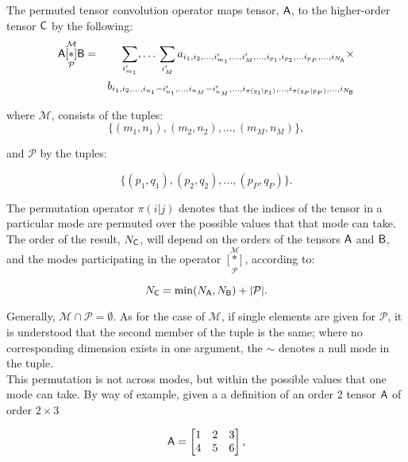 The permuted tensor convolution operator maps tensor, $\mathsf{A}$, to the higher-order tensor $\mathsf{C}$ by the following:
\begin{eqnarray}
\mathsf{A} \underset{\mathcal{P}}{\overset{\mathcal{M}}{[ \ast ]}} {\mathsf{B}} &=& \sum_{i'_{m_1}},\ldots\,\sum_{i_{M}'}   a_{i_1,i_2,...,i_{m_1}',...,i_{M}',...,i_{p_1},i_{p_2},...i_{p_P},...,i_{N_{\mathsf{A}}}} \times \nonumber \\
& &b_{i_1,i_2,...,i_{n_1}-i_{n_1}',...,i_{n_M}-i_{n_M}',...,i_{\pi(q_1|p_1)},...,i_{\pi(q_P|p_P)},...,i_{N_{\mathsf{B}}}}
\label{eq:t2appndx}
\end{eqnarray}

where $\mathcal{M}$, consists of the tuples:
\begin{equation}
\lbrace(m_1,n_1),(m_2,n_2),...,(m_{M},n_{M})\rbrace,
\end{equation}

and $\mathcal{P}$ by the tuples:

\begin{equation}
\lbrace(p_1,q_1),(p_2,q_2),...,(p_{P},q_{P})\rbrace.
\end{equation}

The permutation operator $\pi(i|j)$ denotes that the indices of the tensor in a particular mode are permuted over the possible values that that mode can take.  The order of the result, $N_{\mathsf{C}}$, will depend on the orders of the tensors $\mathsf{A}$ and $\mathsf{B}$, and the modes participating in the operator $\underset{\mathcal{P}}{\overset{\mathcal{M}}{[ \ast ]}}$, according to:

\begin{equation}
N_{\mathsf{C}} = \min(N_{\mathsf{A}},N_{\mathsf{B}}) +  |\mathcal{P}|.
\end{equation}

Generally, $\mathcal{M}\cap\mathcal{P}=\emptyset$.  As for the case of $\mathcal{M}$, if single elements are given for $\mathcal{P}$, it is understood that the second member of the tuple is the same; where no corresponding dimension exists in one argument, the $\sim$ denotes a null mode in the tuple.\\

This permutation is not across modes, but within the possible values that one mode can take.  By way of example, given a a definition of an order 2 tensor $\mathsf{A}$ of order $2\times 3$ 

\begin{equation}
\mathsf{A} = \begin{bmatrix}
1 & 2 & 3 \\
4 & 5 & 6 \\
\end{bmatrix},
\end{equation}

